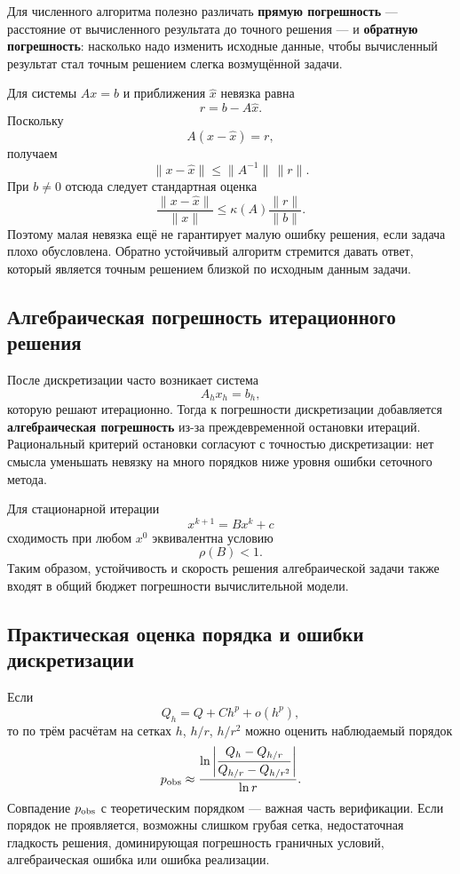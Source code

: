 Для численного алгоритма полезно различать \textbf{прямую погрешность} ---
расстояние от вычисленного результата до точного решения --- и
\textbf{обратную погрешность}: насколько надо изменить исходные данные, чтобы
вычисленный результат стал точным решением слегка возмущённой задачи.

Для системы $Ax=b$ и приближения $\widehat x$ невязка равна
\[
    r=b-A\widehat x.
\]
Поскольку
\[
    A(x-\widehat x)=r,
\]
получаем
\[
    \|x-\widehat x\|\le \|A^{-1}\|\,\|r\|.
\]
При $b\ne0$ отсюда следует стандартная оценка
\[
    \boxed{
    \frac{\|x-\widehat x\|}{\|x\|}
    \le
    \kappa(A)\frac{\|r\|}{\|b\|}.
    }
\]
Поэтому малая невязка ещё не гарантирует малую ошибку решения, если задача плохо
обусловлена. Обратно устойчивый алгоритм стремится давать ответ, который является
точным решением близкой по исходным данным задачи.

\subsection{Алгебраическая погрешность итерационного решения}

После дискретизации часто возникает система
\[
    A_h x_h=b_h,
\]
которую решают итерационно. Тогда к погрешности дискретизации добавляется
\textbf{алгебраическая погрешность} из-за преждевременной остановки итераций.
Рациональный критерий остановки согласуют с точностью дискретизации: нет смысла
уменьшать невязку на много порядков ниже уровня ошибки сеточного метода.

Для стационарной итерации
\[
    x^{k+1}=Bx^k+c
\]
сходимость при любом $x^0$ эквивалентна условию
\[
    \rho(B)<1.
\]
Таким образом, устойчивость и скорость решения алгебраической задачи также
входят в общий бюджет погрешности вычислительной модели.

\subsection{Практическая оценка порядка и ошибки дискретизации}

Если
\[
    Q_h=Q+C h^p+o(h^p),
\]
то по трём расчётам на сетках $h$, $h/r$, $h/r^2$ можно оценить наблюдаемый
порядок
\[
    p_{\rm obs}
    \approx
    \frac{\ln\left|\dfrac{Q_h-Q_{h/r}}
    {Q_{h/r}-Q_{h/r^2}}\right|}{\ln r}.
\]
Совпадение $p_{\rm obs}$ с теоретическим порядком --- важная часть
верификации. Если порядок не проявляется, возможны слишком грубая сетка,
недостаточная гладкость решения, доминирующая погрешность граничных условий,
алгебраическая ошибка или ошибка реализации.

